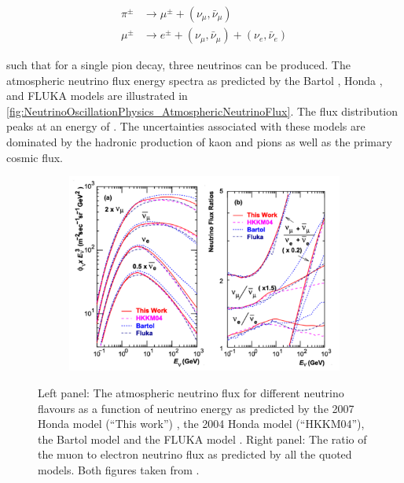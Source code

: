 \begin{equation}
  \label{eq:NeutrinoOscillationPhysics_PionDecay}
  \begin{split}
    \pi^{\pm} &\rightarrow \mu^{\pm} + (\nu_{\mu},\bar{\nu}_\mu) \\
    \mu^{\pm} &\rightarrow e^{\pm} + (\nu_{\mu},\bar{\nu}_\mu) + (\nu_{e},\bar{\nu}_e)
  \end{split}
\end{equation}

such that for a single pion decay, three neutrinos can be produced. The atmospheric neutrino flux energy spectra as predicted by the Bartol \cite{Barr_2004}, Honda \cite{Honda_2007, PhysRevD.70.043008, Honda:2011}, and FLUKA \cite{etde_20239111} models are illustrated in \autoref{fig:NeutrinoOscillationPhysics_AtmosphericNeutrinoFlux}. The flux distribution peaks at an energy of . The uncertainties associated with these models are dominated by the hadronic production of kaon and pions as well as the primary cosmic flux. 

\begin{figure}[h]
  \begin{subfigure}[t]{0.80\textwidth}
    \includegraphics[width=\textwidth, trim={0mm 0mm 0mm 0mm}, clip,page=1]{Figures/Theory/AtmosphericNuFlux.pdf}
  \end{subfigure}
  \caption{Left panel: The atmospheric neutrino flux for different neutrino flavours as a function of neutrino energy as predicted by the 2007 Honda model (``This work'') \cite{Honda_2007}, the 2004 Honda model (``HKKM04'')\cite{PhysRevD.70.043008}, the Bartol model \cite{Barr_2004} and the FLUKA model \cite{etde_20239111}. Right panel: The ratio of the muon to electron neutrino flux as predicted by all the quoted models. Both figures taken from \cite{Honda_2007}.}
  \label{fig:NeutrinoOscillationPhysics_AtmosphericNeutrinoFlux}
\end{figure}

